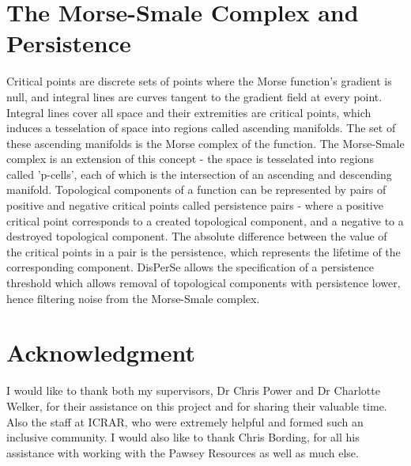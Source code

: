 \documentclass[journal]{IEEEtran}
\begin{document}
\section{The Morse-Smale Complex and Persistence}
Critical points are discrete sets of points where the Morse function's gradient is null, and integral lines are curves tangent to the gradient field at every point. Integral lines cover all space and their extremities are critical points, which induces a tesselation of space into regions called ascending manifolds. The set of these ascending manifolds is the Morse complex of the function. The Morse-Smale complex is an extension of this concept - the space is tesselated into regions called 'p-cells', each of which is the intersection of an ascending and descending manifold. 
Topological components of a function can be represented by pairs of positive and negative critical points called persistence pairs - where a positive critical point corresponds to a created topological component, and a negative to a destroyed topological component. The absolute difference between the value of the critical points in a pair is the persistence, which represents the lifetime of the corresponding component. DisPerSe allows the specification of a persistence threshold which allows removal of topological components with persistence lower, hence filtering noise from the Morse-Smale complex. 

\section*{Acknowledgment}
I would like to thank both my supervisors, Dr Chris Power and Dr Charlotte Welker, for their assistance on this project and for sharing their valuable time. Also the staff at ICRAR, who were extremely helpful and formed such an inclusive community. I would also like to thank Chris Bording, for all his assistance with working with the Pawsey Resources as well as much else. 
\end{document}
